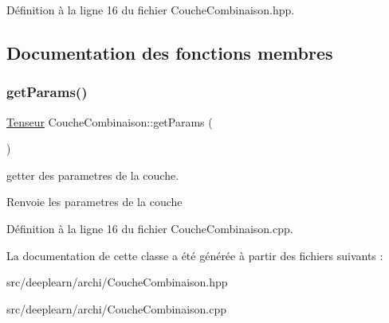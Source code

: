 Définition à la ligne 16 du fichier Couche\+Combinaison.\+hpp.



\subsection{Documentation des fonctions membres}
\mbox{\label{class_couche_combinaison_a49d595f069641090c8fbbdff025db259}} 
\subsubsection{\texorpdfstring{get\+Params()}{getParams()}}
{\footnotesize\ttfamily \hyperlink{class_tenseur}{Tenseur} Couche\+Combinaison\+::get\+Params (\begin{DoxyParamCaption}{ }\end{DoxyParamCaption})}



getter des parametres de la couche. 

\begin{DoxyReturn}{Renvoie}
les parametres de la couche 
\end{DoxyReturn}


Définition à la ligne 16 du fichier Couche\+Combinaison.\+cpp.



La documentation de cette classe a été générée à partir des fichiers suivants \+:\begin{DoxyCompactItemize}
\item 
src/deeplearn/archi/Couche\+Combinaison.\+hpp\item 
src/deeplearn/archi/Couche\+Combinaison.\+cpp\end{DoxyCompactItemize}
